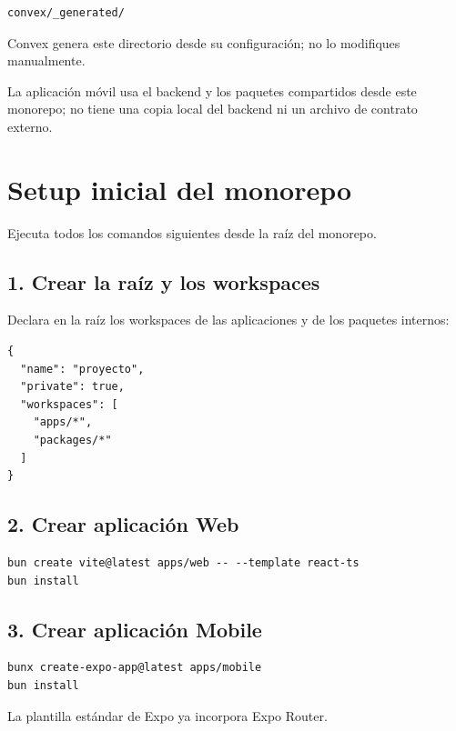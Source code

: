 \documentclass[11pt,a4paper]{article}
\begin{document}
\begin{lstlisting}
convex/_generated/
\end{lstlisting}

Convex genera este directorio desde su configuración; no lo modifiques
manualmente.

La aplicación móvil usa el backend y los paquetes compartidos desde este
monorepo; no tiene una copia local del backend ni un archivo de contrato
externo.

\section{Setup inicial del monorepo}

Ejecuta todos los comandos siguientes desde la raíz del monorepo.

\subsection{1. Crear la raíz y los workspaces}

Declara en la raíz los workspaces de las aplicaciones y de los paquetes
internos:

\begin{lstlisting}
{
  "name": "proyecto",
  "private": true,
  "workspaces": [
    "apps/*",
    "packages/*"
  ]
}
\end{lstlisting}

\subsection{2. Crear aplicación Web}

\begin{lstlisting}
bun create vite@latest apps/web -- --template react-ts
bun install
\end{lstlisting}

\subsection{3. Crear aplicación Mobile}

\begin{lstlisting}
bunx create-expo-app@latest apps/mobile
bun install
\end{lstlisting}

La plantilla estándar de Expo ya incorpora Expo Router.
\end{document}
